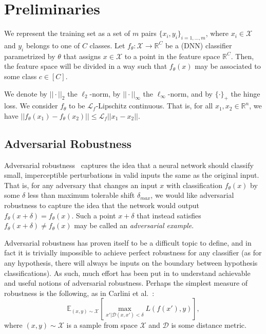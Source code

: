 \section{Preliminaries}

We represent the training set as a set of $m$ pairs $\{x_i, y_i\}_{i = 1, \ldots, m}$, where $x_i\in\mathcal{X}$ and $y_i$ belongs to one of $C$ classes. Let $f_\theta:\mathcal{X}\rightarrow\mathbb{R}^C$ be a (DNN) classifier parametrized by $\theta$ that assigns $x\in\mathcal{X}$ to a point in the feature space $\mathbb{R}^C$. Then, the feature space will be divided in a way such that $f_\theta(x)$ may be associated to some class $c\in[C]$. 

We denote by $||\cdot||_2$ the $\ell_2$-norm, by $||\cdot||_\infty$ the $\ell_\infty$-norm, and by $\{\cdot\}_+$ the hinge loss. We consider $f_\theta$ to be $\mathcal{L}_f$-Lipschitz continuous. That is, for all $x_1, x_2\in \mathbb{R}^n$, we have $||f_\theta(x_1) - f_\theta(x_2)||\leq \mathcal{L}_f||x_1-x_2||$. 

\subsection{Adversarial Robustness}

Adversarial robustness~\cite{Szegedy2013Robust, Biggio2013Robust} captures the idea that a neural network should classify small, imperceptible perturbations in valid inputs the same as the original input. That is, for any adversary that changes an input $x$ with classification $f_\theta(x)$ by some $\delta$ less than maximum tolerable shift $\delta_{max}$, we would like adversarial robustness to capture the idea that the network would output $f_\theta(x+\delta) = f_\theta(x)$. Such a point $x+\delta$ that instead satisfies $f_\theta(x+\delta) \neq f_\theta(x)$ may be called an \emph{adversarial example}.

Adversarial robustness has proven itself to be a difficult topic to define, and in fact it is trivially impossible to achieve perfect robustness for any classifier (as for any hypothesis, there will always be inputs on the boundary between hypothesis classifications). As such, much effort has been put in to understand achievable and useful notions of adversarial robustness. Perhaps the simplest measure of robustness is the following, as in Carlini et al.~\cite{Carlini2019Robustness}:
$$
\mathbb{E}_{(x, y)\sim\mathcal{X}}\left[\max_{x'|\mathcal{D}(x, x') < \delta} L(f(x'), y)\right],
$$
where $(x, y)\sim\mathcal{X}$ is a sample from space $\mathcal{X}$ and $\mathcal{D}$ is some distance metric. 

